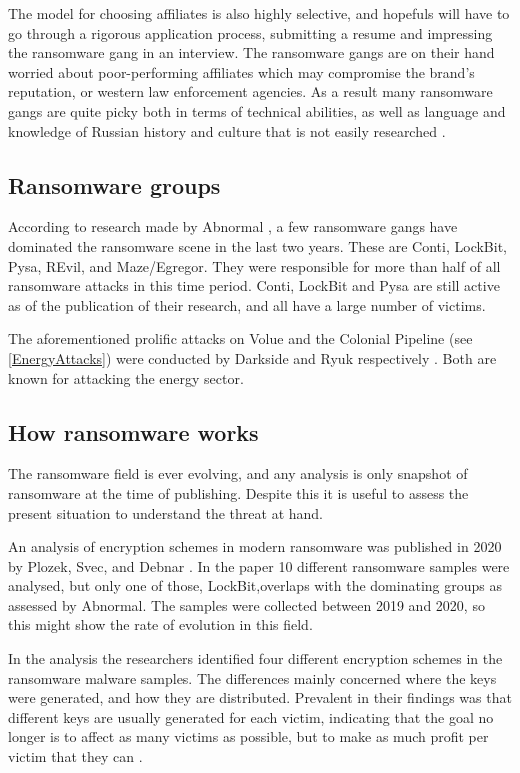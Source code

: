 The model for choosing affiliates is also highly selective, and hopefuls will have to go through a rigorous application process, submitting a resume and impressing the ransomware gang in an interview. The ransomware gangs are on their hand worried about poor-performing affiliates which may compromise the brand's reputation, or western law enforcement agencies. As a result many ransomware gangs are quite picky both in terms of technical abilities, as well as language and knowledge of Russian history and culture that is not easily researched \cite{seals_2021_nodate}.

\subsection{Ransomware groups}
According to research made by Abnormal \cite{noauthor_threat_nodate}, a few ransomware gangs have dominated the ransomware scene in the last two years. These are Conti, LockBit, Pysa, REvil, and Maze/Egregor. They were responsible for more than half of all ransomware attacks in this time period. Conti, LockBit and Pysa are still active as of the publication of their research, and all have a large number of victims.

The aforementioned prolific attacks on Volue and the Colonial Pipeline (see \ref{EnergyAttacks}) were conducted by Darkside and Ryuk respectively \cite{thomas_state_2021}. Both are known for attacking the energy sector. 

\subsection{How ransomware works}
The ransomware field is ever evolving, 
and any analysis is only snapshot of ransomware at the time of publishing.
Despite this it is useful to assess the present situation to understand the threat at hand. 

An analysis of encryption schemes in modern ransomware was published in 2020 by Plozek, Svec, and Debnar \cite{ploszek_analysis_2021}. In the paper 10 different ransomware samples were analysed, but only one of those, LockBit,overlaps with the dominating groups as assessed by Abnormal. The samples were collected between 2019 and 2020, so this might show the rate of evolution in this field. 

In the analysis the researchers identified four different encryption schemes in the ransomware malware samples. The differences mainly concerned where the keys were generated, and how they are distributed. Prevalent in their findings was that different keys are usually generated for each victim, indicating that the goal no longer is to affect as many victims as possible, but to make as much profit per victim that they can \cite{ploszek_analysis_2021}.

